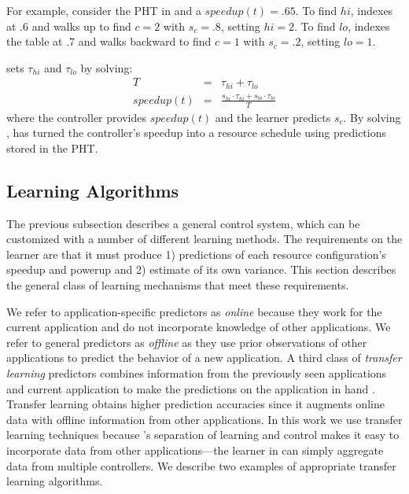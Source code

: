 For example, consider the PHT in  and a $speedup(t) =
.65$.  To find $hi$, \SYSTEM{} indexes at .6 and walks up to find
$c=2$ with $s_c=.8$, setting $hi = 2$.  To find $lo$, \SYSTEM{}
indexes the table at .7 and walks backward to find $c=1$ with
$s_c=.2$, setting $lo = 1$.

\SYSTEM{} sets $\tau_{hi}$ and $\tau_{lo}$ by solving:
\begin{eqnarray}
  T &=& \tau_{hi} + \tau_{lo}    \label{eqn:s1} \\
  speedup(t) &=& \frac{s_{hi} \cdot \tau_{hi} + s_{lo} \cdot \tau_{lo}}{T} \label{eqn:s2}
\end{eqnarray}
where the controller provides $speedup(t)$ and the learner predicts
$s_c$.  By solving , \SYSTEM{} has turned the
controller's speedup into a resource schedule using predictions stored
in the PHT.

\subsection{\SYSTEM{} Learning Algorithms}
The previous subsection describes a general control system, which can
be customized with a number of different learning methods.  The
requirements on the learner are that it must produce 1) predictions of
each resource configuration's speedup and powerup and 2) estimate of
its own variance.  This section describes the general class of
learning mechanisms that meet these requirements.

We refer to application-specific predictors as \emph{online} because
they work for the current application and do not incorporate knowledge
of other applications.  We refer to general predictors as
\emph{offline} as they use prior observations of other applications to
predict the behavior of a new application. A third class of
\emph{transfer learning} predictors combines information from the
previously seen applications and current application to make the
predictions on the application in hand \cite{pan2010survey}. Transfer
learning obtains higher prediction accuracies since it augments online
data with offline information from other applications.  In this work
we use transfer learning techniques because \SYSTEM{}'s separation of
learning and control makes it easy to incorporate data from other
applications---the learner in  can simply
aggregate data from multiple controllers. We describe two examples of
appropriate transfer learning algorithms.

